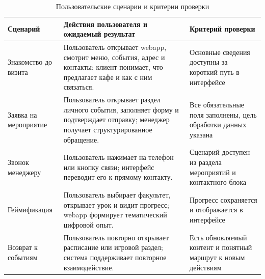 \begin{table}[H]
\centering
\small
\caption{Пользовательские сценарии и критерии проверки}
\label{tab:v2_user_scenarios}
\begin{tabularx}{\textwidth}{|>{\raggedright\arraybackslash}p{}|>{\raggedright\arraybackslash}p{}|>{\raggedright\arraybackslash}X|}
\hline
\textbf{Сценарий} & \textbf{Действия пользователя и ожидаемый результат} & \textbf{Критерий проверки} \\ \hline
Знакомство до визита & Пользователь открывает webapp, смотрит меню, события, адрес и контакты; клиент понимает, что предлагает кафе и как с ним связаться. & Основные сведения доступны за короткий путь в интерфейсе \\ \hline
Заявка на мероприятие & Пользователь открывает раздел личного события, заполняет форму и подтверждает отправку; менеджер получает структурированное обращение. & Все обязательные поля заполнены, цель обработки данных указана \\ \hline
Звонок менеджеру & Пользователь нажимает на телефон или кнопку связи; интерфейс переводит его к прямому контакту. & Сценарий доступен из раздела мероприятий и контактного блока \\ \hline
Геймификация & Пользователь выбирает факультет, открывает урок и видит прогресс; webapp формирует тематический цифровой опыт. & Прогресс сохраняется и отображается в интерфейсе \\ \hline
Возврат к событиям & Пользователь повторно открывает расписание или игровой раздел; система поддерживает повторное взаимодействие. & Есть обновляемый контент и понятный маршрут к новым действиям \\ \hline
\end{tabularx}
\normalsize
\end{table}

